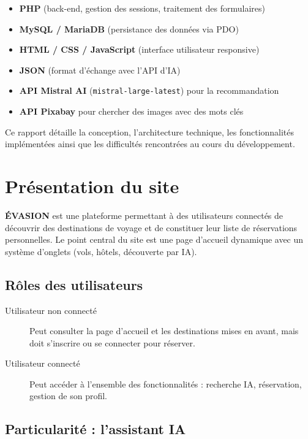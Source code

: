 \documentclass[a4paper,12pt]{article}
\begin{document}
\begin{itemize}
  \item \textbf{PHP} (back-end, gestion des sessions, traitement des formulaires)
  \item \textbf{MySQL / MariaDB} (persistance des données via PDO)
  \item \textbf{HTML / CSS / JavaScript} (interface utilisateur responsive)
  \item \textbf{JSON} (format d'échange avec l'API d'IA)
  \item \textbf{API Mistral AI} (\texttt{mistral-large-latest}) pour la recommandation
  \item \textbf{API Pixabay} pour chercher des images avec des mots clés
\end{itemize}

Ce rapport détaille la conception, l'architecture technique, les fonctionnalités implémentées ainsi que les difficultés rencontrées au cours du développement.

\section{Présentation du site}

\textbf{ÉVASION} est une plateforme permettant à des utilisateurs connectés de découvrir des destinations de voyage et de constituer leur liste de réservations personnelles. Le point central du site est une page d'accueil dynamique avec un système d'onglets (vols, hôtels, découverte par IA).

\subsection{Rôles des utilisateurs}

\begin{description}
  \item[Utilisateur non connecté] Peut consulter la page d'accueil et les destinations mises en avant, mais doit s'inscrire ou se connecter pour réserver.
  \item[Utilisateur connecté] Peut accéder à l'ensemble des fonctionnalités : recherche IA, réservation, gestion de son profil.
\end{description}

\subsection{Particularité : l'assistant IA}
\end{document}
